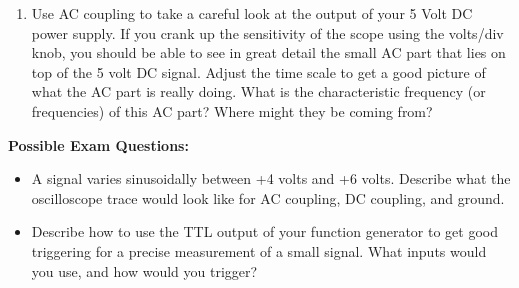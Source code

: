\begin{enumerate}[wide]
\item Use AC coupling to take a careful look at the output of your 5 Volt DC power supply.  If you crank up the sensitivity of the scope using the volts/div knob, you should be able to see in great detail the small AC part that lies on top of the 5 volt DC signal.  Adjust the time scale to get a good picture of what the AC part is really doing.  What is the characteristic frequency (or frequencies) of this AC part?  Where might they be coming from?


\end{enumerate}


\textbf{Possible Exam Questions:}

\begin{itemize}

\item A signal varies sinusoidally between +4 volts and +6 volts.  Describe what the oscilloscope trace would look like for AC coupling, DC coupling, and ground.

\item Describe how to use the TTL output of your function generator to get good triggering for a precise measurement of a small signal. What inputs would you use, and how would you trigger? 

\end{itemize}





